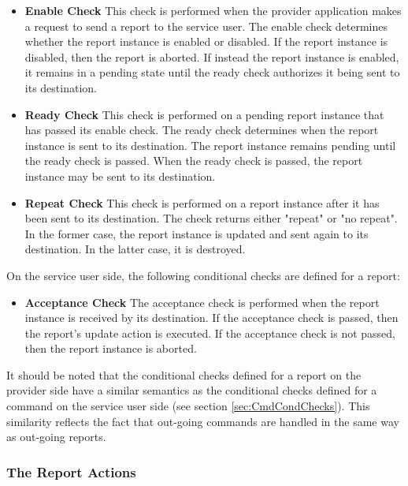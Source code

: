 \begin{itemize}
\item \textbf{Enable Check}
This check is performed when the provider application makes a request to send a report to the service user. The enable check determines whether the report instance is enabled or disabled. If the report instance is disabled, then the report is aborted. If instead the report instance is enabled, it remains in a pending state until the ready check authorizes it being sent to its destination.

\item \textbf{Ready Check}
This check is performed on a pending report instance that has passed its enable check. The ready check determines when the report instance is sent to its destination.  The report instance remains pending until the ready check is passed. When the ready check is passed, the report instance may be sent to its destination.  

\item \textbf{Repeat Check}
This check is performed on a report instance after it has been sent to its destination. The check returns either "repeat" or "no repeat". In the former case, the report instance is updated and sent again to its destination. In the latter case, it is destroyed.
\end{itemize}

On the service user side, the following conditional checks are defined for a report:

\begin{itemize}
\item \textbf{Acceptance Check}
The acceptance check is performed when the report instance is received by its destination. If the acceptance check is passed, then the report's update action is executed. If the acceptance check is not passed, then the report instance is aborted.
\end{itemize}

It should be noted that the conditional checks defined for a report on the provider side have a similar semantics as the conditional checks defined for a command on the service user side (see section \ref{sec:CmdCondChecks}). This similarity reflects the fact that out-going commands are handled in the same way as out-going reports.

\subsubsection{The Report Actions}\label{sec:RepActions}

